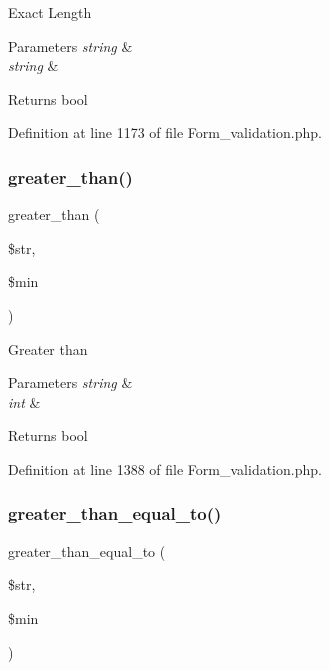 Exact Length


\begin{DoxyParams}{Parameters}
{\em string} & \\
\hline
{\em string} & \\
\hline
\end{DoxyParams}
\begin{DoxyReturn}{Returns}
bool 
\end{DoxyReturn}


Definition at line 1173 of file Form\+\_\+validation.\+php.

\mbox{\label{class_c_i___form__validation_a8dd73c5e1d6880a650bb41e1ec6ee2f4}} 
\subsubsection{\texorpdfstring{greater\_than()}{greater\_than()}}
{\footnotesize\ttfamily greater\+\_\+than (\begin{DoxyParamCaption}\item[{}]{\$str,  }\item[{}]{\$min }\end{DoxyParamCaption})}

Greater than


\begin{DoxyParams}{Parameters}
{\em string} & \\
\hline
{\em int} & \\
\hline
\end{DoxyParams}
\begin{DoxyReturn}{Returns}
bool 
\end{DoxyReturn}


Definition at line 1388 of file Form\+\_\+validation.\+php.

\mbox{\label{class_c_i___form__validation_a003319a504eca3e9d1b608f8e48f2daf}} 
\subsubsection{\texorpdfstring{greater\_than\_equal\_to()}{greater\_than\_equal\_to()}}
{\footnotesize\ttfamily greater\+\_\+than\+\_\+equal\+\_\+to (\begin{DoxyParamCaption}\item[{}]{\$str,  }\item[{}]{\$min }\end{DoxyParamCaption})}

